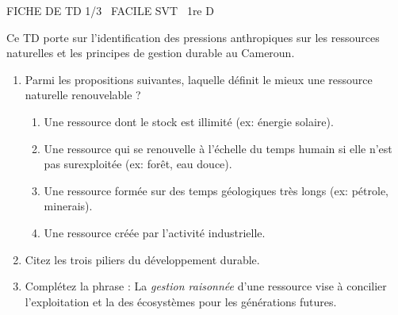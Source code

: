 \documentclass[11pt]{article}
\begin{document}
\begin{tcolorbox}[enhanced,colback=popink,colframe=popink,arc=10pt,boxrule=0pt,left=12pt,right=12pt,top=9pt,bottom=9pt]
{\color{white}\popxbold\small FICHE DE TD 1/3 \textbullet\ FACILE \hfill SVT \textbullet\ 1re D\par}
\end{tcolorbox}
\vspace{4pt}
Ce TD porte sur l'identification des pressions anthropiques sur les ressources naturelles et les principes de gestion durable au Cameroun.

\begin{exercice}
\begin{enumerate}
    \item Parmi les propositions suivantes, laquelle définit le mieux une ressource naturelle renouvelable ?
    \begin{enumerate}
        \item Une ressource dont le stock est illimité (ex: énergie solaire).
        \item Une ressource qui se renouvelle à l'échelle du temps humain si elle n'est pas surexploitée (ex: forêt, eau douce).
        \item Une ressource formée sur des temps géologiques très longs (ex: pétrole, minerais).
        \item Une ressource créée par l'activité industrielle.
    \end{enumerate}
    \item Citez les trois piliers du développement durable.
    \item Complétez la phrase : La \textit{gestion raisonnée} d'une ressource vise à concilier l'exploitation \underline{\hspace{4cm}} et la \underline{\hspace{4cm}} des écosystèmes pour les générations futures.
\end{enumerate}
\end{exercice}
\end{document}
